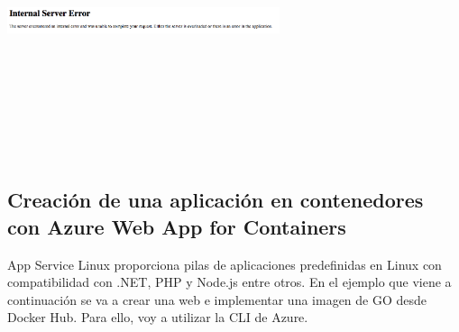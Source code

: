 \documentclass[english,runningheads,a4paper]{llncs}[2018/03/10]
\newenvironment{nscenter}
 {\parskip=0pt\par\nopagebreak\centering}
 {\par\noindent\ignorespacesafterend}
\begin{document}
\begin{nscenter}
\includegraphics[width=8cm,height=8cm,keepaspectratio]{./Contenedores/Azure/17.png}
\end{nscenter}
\newpage
\subsection*{Creación de una aplicación en contenedores con Azure Web App for 
Containers}

App Service Linux proporciona pilas de aplicaciones predefinidas en Linux con 
compatibilidad con .NET, PHP y Node.js entre otros. En el ejemplo que viene a 
continuación se va a crear una web e implementar una imagen de GO desde Docker 
Hub. Para ello, voy a utilizar la CLI de Azure.
\end{document}
